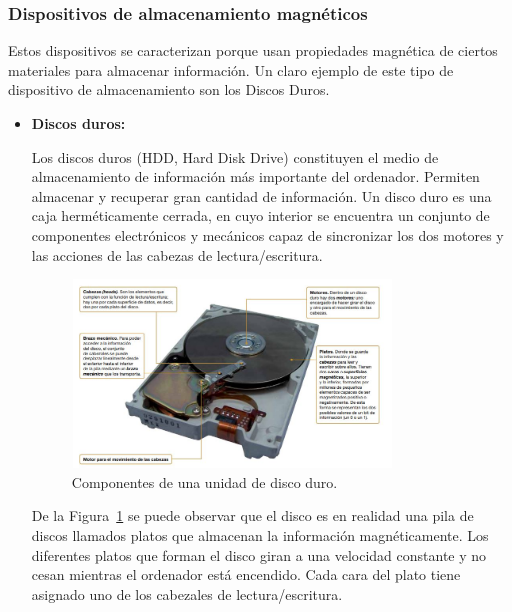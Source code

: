 \documentclass[10pt,journal]{IEEEtran}
\begin{document}
\subsubsection{\textbf{Dispositivos de almacenamiento magnéticos}}\par
Estos dispositivos se caracterizan porque usan propiedades magnética de ciertos materiales para almacenar información. 
Un claro ejemplo de este tipo de dispositivo de almacenamiento son los Discos Duros.
\begin{itemize}
    
    \item \textbf{Discos duros:} \par
    Los discos duros (HDD, Hard Disk Drive) constituyen el medio de almacenamiento de información más importante del ordenador. Permiten almacenar y recuperar gran cantidad de información.
    Un disco duro es una caja herméticamente cerrada, en cuyo interior se encuentra un conjunto de componentes electrónicos y mecánicos capaz de sincronizar los dos motores y las acciones de las cabezas de lectura/escritura.\citep{montaje}
\begin{figure}[H]
 \begin{center}
       \includegraphics[width=8.5cm, height=5cm]{figuras/1.JPG}
      \caption{Componentes de una unidad de disco duro.}
      \label{f1} 
      \end{center}
\end{figure}
De la Figura~\ref{f1} se puede observar que el disco es en realidad una pila de discos llamados platos que almacenan la información magnéticamente. Los diferentes platos que forman el disco giran a una velocidad constante y no cesan mientras el ordenador está encendido. Cada cara del plato tiene asignado uno de los cabezales de lectura/escritura.
\end{itemize}
\end{document}
